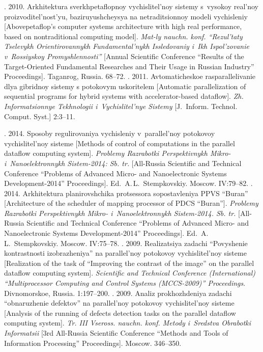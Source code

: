 \begin{multicols}{2}
{{\begin{thebibliography}{99}
  . 2010. 
Arkhitektura sverkhpetaflopnoy vychislitel'noy sistemy s~vysokoy real'noy 
proizvoditel'nost'yu, ba\-zi\-ru\-yushchey\-sya na netraditsionnoy modeli vychisleniy 
[Abovepetaflop's computer systems architecture with high real performance, based 
on nontraditional computing model]. \textit{Mat-ly nauchn. konf. ``Rezul'taty 
Tselevykh Orientirovannykh Fundamental'nykh Issledovaniy i~Ikh Ispol'zovanie 
v~Rossiyskoy Promyshlennosti''} [Annual Scientific Conference ``Results of the 
Target-Oriented Fundamental Researches and Their Usage in Russian Industry'' 
Proceedings]. Taganrog, Russia. 68--72.
  . 2011. Avtomaticheskoe raspa\-ral\-le\-li\-va\-nie dlya gibridnoy 
sistemy s potokovym uskoritelem [Automatic parallelization of sequential programs 
for hybrid systems with accelerator-based dataflow].  \textit{Zh. Informatsionnye 
Tekhnologii i~Vychislitel'nye Sistemy} [J.~Inform. Technol. Comput. 
Syst.]  2:3--11.

  . 
2014. Sposoby regulirovaniya vychisleniy v~parallel'noy potokovoy vychislitel'noy 
sisteme [Methods of control of computations in the parallel dataflow computing 
system]. \textit{Problemy Razrabotki Perspektivnykh Mikro- i~Nanoelektronnykh 
Sistem-2014: Sb. tr.} [All-Russia Scientific and Technical Conference ``Problems 
of Advanced Micro- and Nanoelectronic Systems Development-2014'' 
Proceedings]. Ed.\  A.\,L.~Stempkovskiy. Moscow. IV:79--82.
  . 
2014. Arkhitektura planirovshchika pro\-tses\-so\-ra sopostavleniya PPVS ``Buran'' 
[Architecture of the scheduler of mapping processor of PDCS ``Buran'']. 
\textit{Problemy Razrabotki Perspektivnykh Mikro- i~Nanoelektronnykh Sistem-2014. 
Sb. tr.} [All-Russia Scientific and Technical Conference ``Problems of 
Advanced Micro- and Nanoelectronic Systems Development-2014'' Proceedings]. 
Ed.\  A.\,L.~Stempkovskiy. Moscow. IV:75--78.
  . 2009. Realizatsiya 
zadachi ``Povyshenie kontrastnosti izob\-ra\-zhe\-niya'' na parallel'noy potokovoy 
vychislitel'noy sisteme [Realization of the task of ``Improving the contrast of the 
image'' on the parallel dataflow computing system]. \textit{Scientific and Technical Conference (International) 
``Multiprocessor Computing and Control Systems (MCCS-2009)'' Proceedings}. 
Divnomorskoe, Russia. 1:197--200.
  . 2009. Analiz prokhozhdeniya 
zadachi ``obnaruzhenie defektov'' na pa\-ral\-lel'\-noy potokovoy vychislitel'noy sisteme 
[Analysis of the running of defects detection tasks on the parallel dataflow computing 
system]. \textit{Tr. III Vseross. nauchn. konf. Metody i~Sredstva Obrabotki 
Informatsii} [3rd All-Russia Scientific Conference ``Methods and Tools of 
Information Processing'' Proceedings]. Moscow. 346--350.


\end{thebibliography}}}
\end{multicols}

